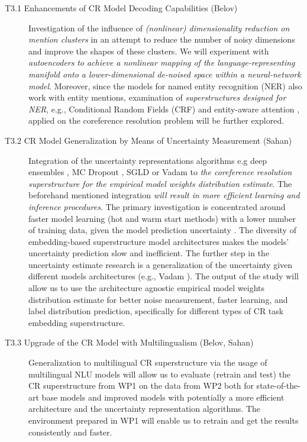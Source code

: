 \begin{description}
	\item [T3.1 Enhancements of CR Model Decoding Capabilities (Belov)] Investigation of the influence of \textit{(nonlinear) dimensionality reduction on mention clusters} in an attempt to reduce the number of noisy dimensions and improve the shapes of these clusters. We will experiment with \textit{autoencoders} \cite{autoencoders-Zabalza2016,autoencoders-Sahay2019} \textit{to achieve a nonlinear mapping of the language-representing manifold onto a lower-dimensional de-noised space within a neural-network model}. Moreover, since the models for named entity recognition (NER) also work with entity mentions, examination of \textit{superstructures designed for NER}, e.g., Conditional Random Fields (CRF) \cite{ner-Strakova2019,ner-Zhanming2019} and entity-aware attention \cite{ner-Yamada2020}, applied on the coreference resolution problem will be further explored.

	\item [T3.2 CR Model Generalization by Means of Uncertainty Measurement (Sahan)] Integration of the uncertainty representations algorithms e.g deep ensembles \cite{lakshminarayanan2016simple}, MC Dropout \cite{gal2017deep}, SGLD \cite{welling2011bayesian} or Vadam \cite{khan2018fast} to \textit{the coreference resolution superstructure for the empirical model weights distribution estimate}. The beforehand mentioned integration  \textit{will result in more efficient learning and inference procedures}. The primary investigation is concentrated around faster model learning (hot and warm start methods) with a lower number of training data, given the model prediction uncertainty \cite{sahan2021active}. The diversity of embedding-based superstructure model architectures makes the models' uncertainty prediction slow and inefficient. The further step in the uncertainty estimate research is a generalization of the uncertainty given different models architectures (e.g., Vadam \cite{khan2018fast}). The output of the study will allow us to use the architecture agnostic empirical model weights distribution estimate for better noise measurement, faster learning, and label distribution prediction, specifically for different types of CR task embedding superstructure.
	
	\item [T3.3 Upgrade of the CR Model with Multilingualism (Belov, Sahan)] Generalization to multilingual CR superstructure via the usage of multilingual NLU models will allow us to evaluate (retrain and test) the CR superstructure from WP1 on the data from WP2 both for state-of-the-art base models and improved models with potentially a more efficient architecture and the uncertainty representation algorithms. The environment prepared in WP1 will enable us to retrain and get the results consistently and faster. 
	


\end{description}
